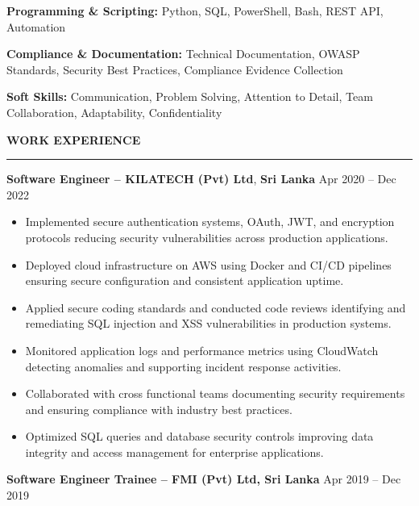 \documentclass[10pt,letterpaper]{article}
\begin{document}
\textbf{Programming \& Scripting:} Python, SQL, PowerShell, Bash, REST API, Automation

\textbf{Compliance \& Documentation:} Technical Documentation, OWASP Standards, Security Best Practices, Compliance Evidence Collection

\textbf{Soft Skills:} Communication, Problem Solving, Attention to Detail, Team Collaboration, Adaptability, Confidentiality

\vspace{8pt}

\textbf{WORK EXPERIENCE}\\[-8pt]
\noindent\rule{\textwidth}{1pt}

\vspace{-2pt}

\textbf{Software Engineer -- KILATECH (Pvt) Ltd}, \textbf{Sri Lanka} \hfill Apr 2020 -- Dec 2022

\vspace{-1pt}

\begin{itemize}
\item Implemented secure authentication systems, OAuth, JWT, and encryption protocols reducing security vulnerabilities across production applications.
\item Deployed cloud infrastructure on AWS using Docker and CI/CD pipelines ensuring secure configuration and consistent application uptime.
\item Applied secure coding standards and conducted code reviews identifying and remediating SQL injection and XSS vulnerabilities in production systems.
\item Monitored application logs and performance metrics using CloudWatch detecting anomalies and supporting incident response activities.
\item Collaborated with cross functional teams documenting security requirements and ensuring compliance with industry best practices.
\item Optimized SQL queries and database security controls improving data integrity and access management for enterprise applications.
\end{itemize}

\textbf{Software Engineer Trainee -- FMI (Pvt) Ltd, Sri Lanka} \hfill Apr 2019 -- Dec 2019

\vspace{-1pt}
\end{document}
